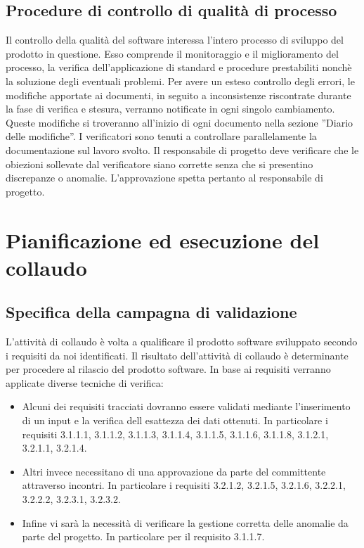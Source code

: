 \documentclass[11pt,titlepage,a4paper]{report}
\begin{document}
\section{Procedure di controllo di qualit\`a di processo}
Il controllo della qualit\`a del software interessa l'intero processo di sviluppo del prodotto in questione. Esso comprende il monitoraggio e il miglioramento del processo, la verifica dell'applicazione di standard e procedure prestabiliti nonch\`e la soluzione degli eventuali problemi.
Per avere un esteso controllo degli errori, le modifiche apportate ai documenti, in seguito a inconsistenze riscontrate durante la fase di verifica e stesura, verranno notificate in ogni singolo cambiamento. Queste modifiche si troveranno all'inizio di ogni documento nella sezione ''Diario delle modifiche''. I verificatori sono tenuti a controllare parallelamente la documentazione sul lavoro svolto. Il responsabile di progetto deve verificare che le obiezioni sollevate dal verificatore siano corrette senza che si presentino discrepanze o anomalie. L'approvazione spetta pertanto al responsabile di progetto.

\chapter{Pianificazione ed esecuzione del collaudo}
\section{Specifica della campagna di validazione}
L'attivit\`a di collaudo \`e volta a qualificare il prodotto software sviluppato secondo i requisiti da noi identificati. Il risultato dell'attivit\`a di collaudo \`e determinante per procedere al rilascio del prodotto software. In base ai requisiti verranno applicate diverse tecniche di verifica:
\begin{itemize}
\item Alcuni dei requisiti tracciati dovranno essere validati mediante l'inserimento di un input e la verifica dell esattezza dei dati ottenuti. In particolare i requisiti 3.1.1.1, 3.1.1.2, 3.1.1.3, 3.1.1.4, 3.1.1.5, 3.1.1.6, 3.1.1.8, 3.1.2.1, 3.2.1.1, 3.2.1.4.
\item Altri invece necessitano di una approvazione da parte del committente attraverso incontri. In particolare i requisiti 3.2.1.2, 3.2.1.5, 3.2.1.6, 3.2.2.1, 3.2.2.2, 3.2.3.1, 3.2.3.2.
\item Infine vi sar\`a la necessit\`a di verificare la gestione corretta delle anomalie da parte del progetto. In particolare per il requisito 3.1.1.7.
\end{itemize}
\end{document}

